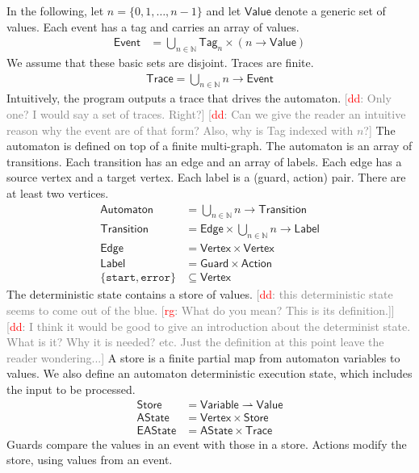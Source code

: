 \documentclass[preprint]{sigplanconf} %
\newcommand{\note}[2]{\textcolor{gray}{[\textcolor{red}{#1}: #2]}}
\newcommand{\rg}[1]{\note{rg}{#1}}
\newcommand{\dd}[1]{\note{dd}{#1}}
\newcommand{\dinocomment}[1]{\dd{#1}}
\newcommand{\N}{\ensuremath{\mathbb{N}}}
\newcommand{\pmap}{\rightharpoonup}
\newcommand{\set}[1]{\ensuremath{\mathsf{#1}}}
\theoremstyle{definition}
\theoremstyle{remark}
\begin{document}
In the following, let $n=\{0,1,\ldots,n-1\}$ and let \set{Value} denote a generic set of values.
Each event has a tag and carries an array of values.
\begin{align}
\set{Event}&=\bigcup_{n\in\N}\set{Tag}_n\times(n\to\set{Value})
\end{align}
We assume that these basic sets are disjoint.
Traces are finite.
\begin{align}
\set{Trace}=\bigcup_{n\in\N} n\to\set{Event} \label{eq:trace}
\end{align}
Intuitively, the program outputs a trace that drives the automaton.
\dinocomment{Only one? I would say a set of traces. Right?}
\dinocomment{Can we give the reader an intuitive reason why the event are of that form? Also, why is Tag indexed with $n$?}
The automaton is defined on top of a finite multi-graph.
The automaton is an array of transitions.
Each transition has an edge and an array of labels.
Each edge has a source vertex and a target vertex.
Each label is a (guard, action) pair.
There are at least two vertices.
\begin{align}
\set{Automaton} &= \bigcup_{n\in\N} n \to \set{Transition} \\
\set{Transition} &= \set{Edge}\times \bigcup_{n\in\N} n\to\set{Label} \\
\set{Edge}&=\set{Vertex}\times\set{Vertex} \\
\set{Label}&=\set{Guard}\times\set{Action} \\
\{\mathtt{start},\mathtt{error}\}&\subseteq\set{Vertex}
\end{align}
The deterministic state contains a store of values.
\dinocomment{this deterministic state seems to come out of the blue.
\rg{What do you mean?
This is its definition.}}
\dinocomment{I think it would be good to give an introduction about the determinist state. What is it? Why it is needed?
etc. Just the definition at this point leave the reader wondering...}
A store is a finite partial map from automaton variables to values.
We also define an automaton deterministic execution state, which includes the input to be processed.
\begin{align}
\set{Store}&=\set{Variable}\pmap\set{Value} \\
\set{AState}&=\set{Vertex}\times\set{Store} \label{eq:astate} \\
\set{EAState}&=\set{AState}\times\set{Trace} \label{eq:eastate}
\end{align}
Guards compare the values in an event with those in a store.
Actions modify the store, using values from an event.
\end{document}

